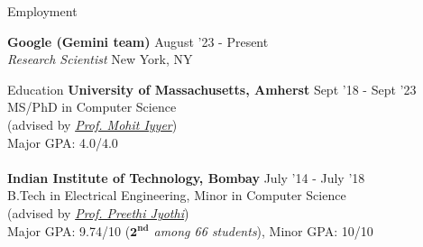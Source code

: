 \documentclass{resume} %
\begin{document}

\begin{rSection}{Employment}
\vspace*{0.1in}

{\bf Google (Gemini team)} { \hfill August '23 - Present}\\ \textit{Research Scientist} {\hfill New York, NY}

\end{rSection}

\begin{rSection}{Education}
\vspace*{0.1in}
{\bf University of Massachusetts, Amherst} \hfill {Sept '18 - Sept '23} \\ MS/PhD in Computer Science \\ (advised by \textit{\href{https://people.cs.umass.edu/~miyyer/}{Prof. Mohit Iyyer}}) \\
Major GPA: 4.0/4.0\\\\
{\bf Indian Institute of Technology, Bombay} \hfill {July '14 - July '18} \\ 
B.Tech in Electrical Engineering, Minor in Computer Science\\
(advised by \textit{\href{https://www.cse.iitb.ac.in/~pjyothi/}{Prof. Preethi Jyothi}})\\
Major GPA: 9.74/10 (\textit{$\mathbf{2^{nd}}$ among 66 students}), Minor GPA: 10/10
\end{rSection}
\end{document}

